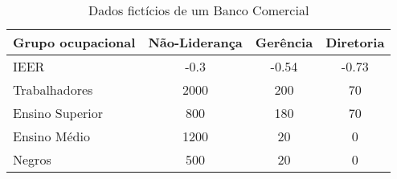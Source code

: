 \begin{table}[htb!]
\centering
\caption{Dados fictícios de um Banco Comercial }
\begin{tabular}{lccc}
\hline
Grupo ocupacional & Não-Liderança & Gerência & Diretoria \\ \hline
IEER              & -0.3          & -0.54    & -0.73     \\
Trabalhadores     & 2000          & 200      & 70        \\
Ensino Superior   & 800           & 180      & 70        \\
Ensino Médio      & 1200          & 20       & 0         \\
Negros            & 500           & 20       & 0         \\ \hline
\end{tabular}
\end{table}